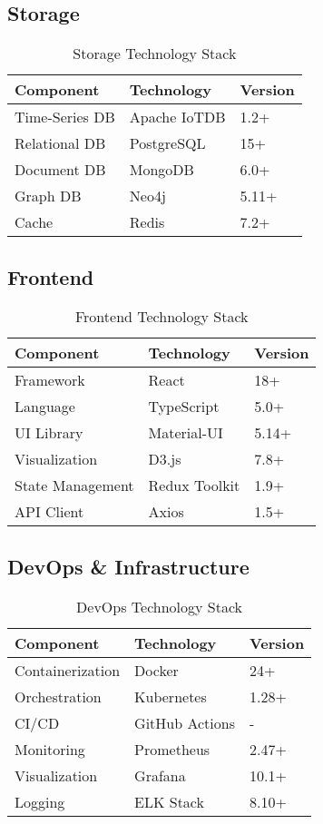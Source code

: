 \documentclass[12pt,a4paper]{article}
\begin{document}
\subsection{Storage}

\begin{table}[H]
\centering
\small
\begin{tabular}{|l|l|l|}
\hline
\textbf{Component} & \textbf{Technology} & \textbf{Version} \\
\hline
Time-Series DB & Apache IoTDB & 1.2+ \\
Relational DB & PostgreSQL & 15+ \\
Document DB & MongoDB & 6.0+ \\
Graph DB & Neo4j & 5.11+ \\
Cache & Redis & 7.2+ \\
\hline
\end{tabular}
\caption{Storage Technology Stack}
\end{table}

\subsection{Frontend}

\begin{table}[H]
\centering
\small
\begin{tabular}{|l|l|l|}
\hline
\textbf{Component} & \textbf{Technology} & \textbf{Version} \\
\hline
Framework & React & 18+ \\
Language & TypeScript & 5.0+ \\
UI Library & Material-UI & 5.14+ \\
Visualization & D3.js & 7.8+ \\
State Management & Redux Toolkit & 1.9+ \\
API Client & Axios & 1.5+ \\
\hline
\end{tabular}
\caption{Frontend Technology Stack}
\end{table}

\subsection{DevOps \& Infrastructure}

\begin{table}[H]
\centering
\small
\begin{tabular}{|l|l|l|}
\hline
\textbf{Component} & \textbf{Technology} & \textbf{Version} \\
\hline
Containerization & Docker & 24+ \\
Orchestration & Kubernetes & 1.28+ \\
CI/CD & GitHub Actions & - \\
Monitoring & Prometheus & 2.47+ \\
Visualization & Grafana & 10.1+ \\
Logging & ELK Stack & 8.10+ \\
\hline
\end{tabular}
\caption{DevOps Technology Stack}
\end{table}
\end{document}
